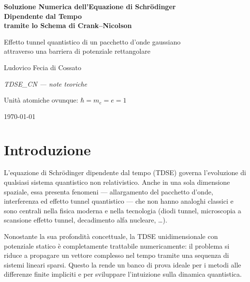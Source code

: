 \documentclass[12pt, a4paper]{article}
\begin{document}
\begin{titlepage}
  \centering
  \vspace*{3cm}
  {\LARGE\bfseries Soluzione Numerica dell'Equazione di Schr\"{o}dinger\\[6pt]
   Dipendente dal Tempo\\[4pt]
   tramite lo Schema di Crank--Nicolson\par}
  \vspace{1.5cm}
  {\large Effetto tunnel quantistico di un pacchetto d'onde gaussiano\\
   attraverso una barriera di potenziale rettangolare\par}
  \vspace{2cm}
  {\large Ludovico Fecia di Cossato\par}
  \vfill
  {\large\itshape TDSE\_CN — note teoriche\par}
  \vspace{0.5cm}
  {\normalsize Unità atomiche ovunque: $\hbar = m_e = e = 1$\par}
  \vspace{1cm}
  {\normalsize \today\par}
\end{titlepage}

\tableofcontents
\newpage

\section{Introduzione}

L'equazione di Schr\"{o}dinger dipendente dal tempo (TDSE) governa l'evoluzione
di qualsiasi sistema quantistico non relativistico. Anche in una sola dimensione
spaziale, essa presenta fenomeni — allargamento del pacchetto d'onde, interferenza
ed effetto tunnel quantistico — che non hanno analoghi classici e sono centrali
nella fisica moderna e nella tecnologia (diodi tunnel, microscopia a
scansione effetto tunnel, decadimento alfa nucleare, \ldots).

Nonostante la sua profondità concettuale, la TDSE unidimensionale con potenziale
statico è completamente trattabile numericamente: il problema si riduce a propagare
un vettore complesso nel tempo tramite una sequenza di sistemi lineari sparsi.
Questo la rende un banco di prova ideale per i metodi alle differenze finite
impliciti e per sviluppare l'intuizione sulla dinamica quantistica.
\end{document}
